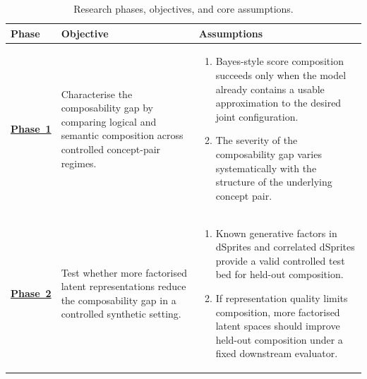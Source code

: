\begin{table}[htbp]
    \centering
    \caption{Research phases, objectives, and core assumptions.}
    \label{tab:phase_overview}
    \footnotesize
    \renewcommand{\arraystretch}{1.05}
    \setlength{\tabcolsep}{4pt}
    \begin{tabularx}{\textwidth}{|>{\centering\arraybackslash}m{}|>{\raggedright\arraybackslash}p{}|>{\raggedright\arraybackslash}X|}
        \hline
        \rowcolor[HTML]{D9EDF7}
        \textbf{Phase} & \textbf{Objective} & \textbf{Assumptions} \\
        \hline
        \hyperref[sec:phase_1]{\textbf{Phase~1}} &
        Characterise the composability gap by comparing logical and semantic composition across controlled concept-pair regimes. &
        \begin{minipage}[t]{\hsize}
            \vspace{1pt}
            \begin{enumerate}[leftmargin=*, nosep]
                \item Bayes-style score composition succeeds only when the model already contains a usable approximation to the desired joint configuration.
                \item The severity of the composability gap varies systematically with the structure of the underlying concept pair.
            \end{enumerate}
            \vspace{1pt}
        \end{minipage} \\
        \hline
        \hyperref[sec:phase_2]{\textbf{Phase~2}} &
        Test whether more factorised latent representations reduce the composability gap in a controlled synthetic setting. &
        \begin{minipage}[t]{\hsize}
            \vspace{1pt}
            \begin{enumerate}[leftmargin=*, nosep]
                \item Known generative factors in dSprites and correlated dSprites provide a valid controlled test bed for held-out composition.
                \item If representation quality limits composition, more factorised latent spaces should improve held-out composition under a fixed downstream evaluator.
            \end{enumerate}
            \vspace{1pt}

\end{minipage}
\end{tabularx}
\end{table}
